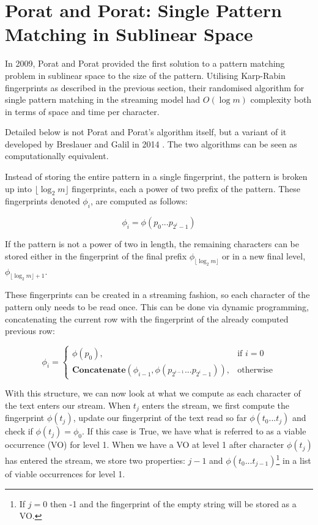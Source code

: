 \documentclass[ %
                    author={Dominic Joseph Moylett},
                    degree={MEng},
                     title={Dictionary Matching with Fingerprints},
                  subtitle={An Empirical Analysis},
                      type={research},
                      year={2015} ]{dissertation}
\begin{document}
\section{Porat and Porat: Single Pattern Matching in Sublinear Space}
\label{sec:porat-porat}

In 2009, Porat and Porat \cite{5438620} provided the first solution to a pattern matching problem in sublinear space to the size of the pattern. Utilising Karp-Rabin fingerprints as described in the previous section, their randomised algorithm for single pattern matching in the streaming model had $O(\log m)$ complexity both in terms of space and time per character.

Detailed below is not Porat and Porat's algorithm itself, but a variant of it developed by Breslauer and Galil in 2014 \cite{Breslauer:2014:RSS:2660854.2635814}. The two algorithms can be seen as computationally equivalent.

Instead of storing the entire pattern in a single fingerprint, the pattern is broken up into $\lfloor \log_2 m\rfloor$ fingerprints, each a power of two prefix of the pattern. These fingerprints denoted $\phi_i$, are computed as follows:

$$\phi_i = \phi(p_0...p_{2^i-1})$$

If the pattern is not a power of two in length, the remaining characters can be stored either in the fingerprint of the final prefix $\phi_{\lfloor\log_2m\rfloor}$ or in a new final level, $\phi_{\lfloor\log_2m\rfloor + 1}$.

These fingerprints can be created in a streaming fashion, so each character of the pattern only needs to be read once. This can be done via dynamic programming, concatenating the current row with the fingerprint of the already computed previous row:

\[
  \phi_i =
  \begin{cases}
    \phi(p_0),& \text{if } i = 0\\
    \textbf{Concatenate}(\phi_{i - 1}, \phi(p_{2^{i-1}}...p_{2^i-1})),& \text{otherwise}
  \end{cases}
\]

With this structure, we can now look at what we compute as each character of the text enters our stream. When $t_j$ enters the stream, we first compute the fingerprint $\phi(t_j)$, update our fingerprint of the text read so far $\phi(t_0...t_j)$ and check if $\phi(t_j) = \phi_0$. If this case is True, we have what is referred to as a viable occurrence (VO) for level 1. When we have a VO at level 1 after character $\phi(t_j)$ has entered the stream, we store two properties: $j-1$ and $\phi(t_0...t_{j-1})$\footnote{If $j = 0$ then -1 and the fingerprint of the empty string will be stored as a VO.} in a list of viable occurrences for level 1.
\end{document}
